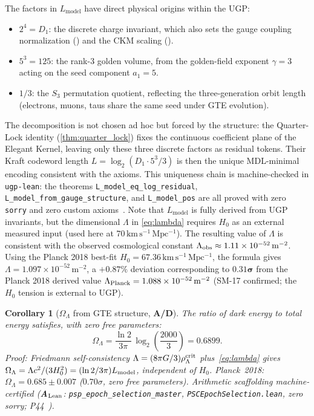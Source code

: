 \documentclass[11pt]{article}
\newtheorem{corollary}[theorem]{Corollary}
\theoremstyle{remark}
\newcommand{\CatAL}{\textbf{A}$_{\rm Lean}$}
\newcommand{\CatAD}{\textbf{A/D}}
\begin{document}
The factors in $L_{\mathrm{model}}$ have direct physical origins within the UGP:
\begin{itemize}[leftmargin=1.2em,itemsep=0.1em]
  \item $2^4 = D_1$: the discrete charge invariant, which also sets the gauge coupling normalization () and the CKM scaling ().
  \item $5^3 = 125$: the rank-3 golden volume, from the golden-field exponent $\gamma = 3$ acting on the seed component $a_1 = 5$.
  \item $1/3$: the $S_3$ permutation quotient, reflecting the three-generation orbit length (electrons, muons, taus share the same seed under GTE evolution).
\end{itemize}
The decomposition is not chosen ad hoc but forced by the structure: the Quarter-Lock identity (\cref{thm:quarter_lock}) fixes the continuous coefficient plane of the Elegant Kernel, leaving only these three discrete factors as residual tokens.
Their Kraft codeword length $L = \log_2(D_1 \cdot 5^3 / 3)$ is then the unique MDL-minimal encoding consistent with the axioms.
This uniqueness chain is machine-checked in \texttt{ugp-lean}: the theorems \texttt{L\_model\_eq\_log\_residual}, \texttt{L\_model\_from\_gauge\_structure}, and \texttt{L\_model\_pos} are all proved with zero \texttt{sorry} and zero custom axioms~\cite{SpivackUGPFormalization,ugp-lean}.
Note that $L_{\mathrm{model}}$ is fully derived from UGP invariants, but the dimensional $\Lambda$ in \cref{eq:lambda} requires $H_0$ as an external measured input (used here at $70\,\mathrm{km\,s^{-1}\,Mpc^{-1}}$).
The resulting value of $\Lambda$ is consistent with the observed cosmological constant $\Lambda_{\rm obs} \approx 1.11 \times 10^{-52}\,\text{m}^{-2}$.  Using the Planck 2018 best-fit $H_0 = 67.36\,\mathrm{km\,s^{-1}\,Mpc^{-1}}$, the formula gives $\Lambda = 1.097 \times 10^{-52}\,\text{m}^{-2}$, a $+0.87\%$ deviation corresponding to $\mathbf{0.31\sigma}$ from the Planck 2018 derived value $\Lambda_{\rm Planck} = 1.088 \times 10^{-52}\,\text{m}^{-2}$ (SM-17 confirmed; the $H_0$ tension is external to UGP).

\begin{corollary}[$\Omega_\Lambda$ from GTE structure, \CatAD]
\label{cor:omega_lambda}
The ratio of dark energy to total energy satisfies, with zero free parameters:
\begin{equation}
  \Omega_\Lambda
  = \frac{\ln 2}{3\pi}\,\log_2\!\left(\frac{2000}{3}\right)
  = 0.6899.
\end{equation}
\textit{Proof:} Friedmann self-consistency $\Lambda = (8\pi G/3)\rho_\Lambda^{\rm crit}$
plus~\eqref{eq:lambda} gives $\Omega_\Lambda = \Lambda c^2/(3H_0^2)
= (\ln2/3\pi)L_{\rm model}$, independent of $H_0$.  Planck~2018:
$\Omega_\Lambda = 0.685 \pm 0.007$ ($0.70\sigma$, zero free parameters).
Arithmetic scaffolding machine-certified (\CatAL:
\texttt{psp\_epoch\_selection\_master}, \texttt{PSCEpochSelection.lean}, zero sorry;
P44~\cite{SpivackQGR}).
\end{corollary}
\end{document}
